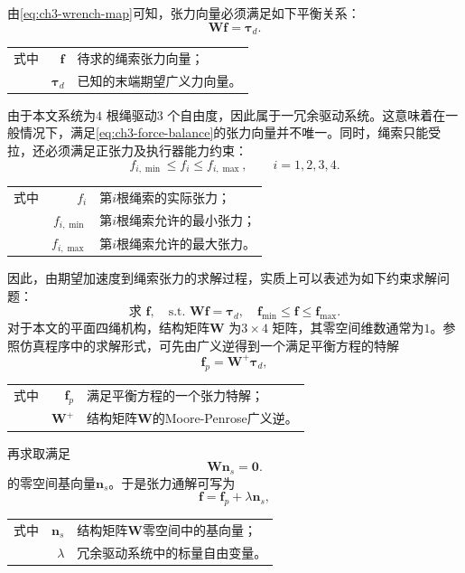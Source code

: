 由\cref{eq:ch3-wrench-map}可知，张力向量必须满足如下平衡关系：
\begin{equation}
  \bm W\bm f=\bm \tau_d. \label{eq:ch3-force-balance}
\end{equation}
\begin{tabularx}{\textwidth}{@{}l@{\quad}r@{———}X@{}}
  式中 & $\bm f$ & 待求的绳索张力向量；\\
       & $\bm \tau_d$ & 已知的末端期望广义力向量。
\end{tabularx}
由于本文系统为$4$ 根绳驱动$3$ 个自由度，因此属于一冗余驱动系统。这意味着在一般情况下，满足\cref{eq:ch3-force-balance}的张力向量并不唯一。同时，绳索只能受拉，还必须满足正张力及执行器能力约束：
\begin{equation}
  f_{i,\min}\le f_i\le f_{i,\max},\qquad i=1,2,3,4. \label{eq:ch3-force-bound}
\end{equation}
\begin{tabularx}{\textwidth}{@{}l@{\quad}r@{———}X@{}}
  式中 & $f_i$ & 第$i$根绳索的实际张力；\\
       & $f_{i,\min}$ & 第$i$根绳索允许的最小张力；\\
       & $f_{i,\max}$ & 第$i$根绳索允许的最大张力。
\end{tabularx}
因此，由期望加速度到绳索张力的求解过程，实质上可以表述为如下约束求解问题：
\begin{equation}
  \text{求 } \bm f, \quad \text{s.t. } \bm W\bm f=\bm \tau_d, \quad \bm f_{\min}\le \bm f\le \bm f_{\max}. \label{eq:ch3-force-distribution-problem}
\end{equation}
对于本文的平面四绳机构，结构矩阵$\bm W$ 为$3\times4$ 矩阵，其零空间维数通常为$1$。参照仿真程序中的求解形式，可先由广义逆得到一个满足平衡方程的特解
\begin{equation}
  \bm f_p=\bm W^{+}\bm \tau_d, \label{eq:ch3-force-particular}
\end{equation}
\begin{tabularx}{\textwidth}{@{}l@{\quad}r@{———}X@{}}
  式中 & $\bm f_p$ & 满足平衡方程的一个张力特解；\\
       & $\bm W^{+}$ & 结构矩阵$\bm W$的Moore-Penrose广义逆。
\end{tabularx}
再求取满足
\begin{equation}
  \bm W\bm n_s=\bm 0.
\end{equation}
的零空间基向量$\bm n_s$。于是张力通解可写为
\begin{equation}
  \bm f=\bm f_p+\lambda\bm n_s, \label{eq:ch3-force-general-solution}
\end{equation}
\begin{tabularx}{\textwidth}{@{}l@{\quad}r@{———}X@{}}
  式中 & $\bm n_s$ & 结构矩阵$\bm W$零空间中的基向量；\\
       & $\lambda$ & 冗余驱动系统中的标量自由变量。
\end{tabularx}

